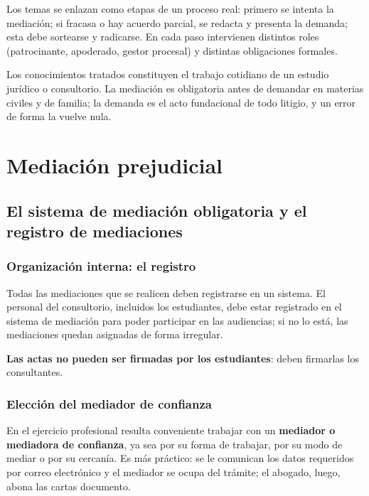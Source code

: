 \documentclass[12pt,oneside]{book}
\begin{document}
Los temas se enlazan como etapas de un proceso real: primero se intenta la mediación; si fracasa o hay acuerdo parcial, se redacta y presenta la demanda; esta debe sortearse y radicarse. En cada paso intervienen distintos roles (patrocinante, apoderado, gestor procesal) y distintas obligaciones formales.

\begin{note}
Los conocimientos tratados constituyen el trabajo cotidiano de un estudio jurídico o consultorio. La mediación es obligatoria antes de demandar en materias civiles y de familia; la demanda es el acto fundacional de todo litigio, y un error de forma la vuelve nula.
\end{note}

\chapter{Mediación prejudicial}

\section{El sistema de mediación obligatoria y el registro de mediaciones}

\subsection{Organización interna: el registro}

Todas las mediaciones que se realicen deben registrarse en un sistema. El personal del consultorio, incluidos los estudiantes, debe estar registrado en el sistema de mediación para poder participar en las audiencias; si no lo está, las mediaciones quedan asignadas de forma irregular.

\textbf{Las actas no pueden ser firmadas por los estudiantes}: deben firmarlas los consultantes.

\subsection{Elección del mediador de confianza}

En el ejercicio profesional resulta conveniente trabajar con un \textbf{mediador o mediadora de confianza}, ya sea por su forma de trabajar, por su modo de mediar o por su cercanía. Es más práctico: se le comunican los datos requeridos por correo electrónico y el mediador se ocupa del trámite; el abogado, luego, abona las cartas documento.
\end{document}
